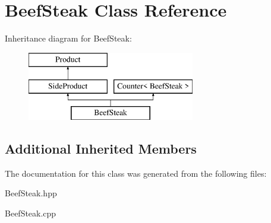 \hypertarget{class_beef_steak}{}\section{Beef\+Steak Class Reference}
\label{class_beef_steak}
Inheritance diagram for Beef\+Steak\+:\begin{figure}[H]
\begin{center}
\leavevmode
\includegraphics[height=3.000000cm]{class_beef_steak}
\end{center}
\end{figure}
\subsection*{Additional Inherited Members}


The documentation for this class was generated from the following files\+:\begin{DoxyCompactItemize}
\item 
Beef\+Steak.\+hpp\item 
Beef\+Steak.\+cpp\end{DoxyCompactItemize}
